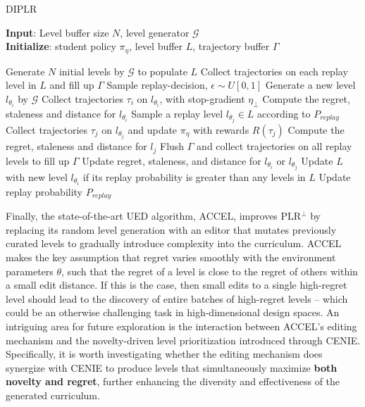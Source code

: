 \begin{algorithm}[H]
    \caption{DIPLR}
    \label{alg:diplr}
    \textbf{Input}: Level buffer size $N$, level generator $\mathcal{G}$ \\
    \textbf{Initialize}: student policy $\pi_\eta$, level buffer $L$, trajectory buffer $\Gamma$
    \begin{algorithmic}[1]
    \STATE Generate $N$ initial levels by $\mathcal{G}$ to populate $L$
    \STATE Collect trajectories on each replay level in $L$ and fill up $\Gamma$
        \STATE Sample replay-decision, $\epsilon \sim U[0,1]$
        \STATE Generate a new level $l_{\theta_i}$ by $\mathcal{G}$
        \STATE Collect trajectories $\tau_i$ on $l_{\theta_i}$, with stop-gradient $\eta_{\perp}$
        \STATE Compute the regret, staleness and distance for $l_{\theta_i}$
        \ELSE
        \STATE Sample a replay level $l_{\theta_j}\in L$ according to $P_{replay}$
        \STATE Collect trajectories $\tau_j$ on $l_{\theta_j}$ and update $\pi_\eta$ with rewards $R(\tau_j)$
        \STATE Compute the regret, staleness and distance for $l_j$
        \ENDIF
        \STATE Flush $\Gamma$ and collect trajectories on all replay levels to fill up $\Gamma$
        \STATE Update regret, staleness, and distance for $l_{\theta_i}$ or $l_{\theta_j}$
        \STATE Update $L$ with new level $l_{\theta_i}$ if its replay probability is greater than any levels in $L$
        \STATE Update replay probability $P_{replay}$ 
        \ENDWHILE
    \end{algorithmic}
\end{algorithm} 

Finally, the state-of-the-art UED algorithm, ACCEL, improves PLR$^\perp$ by replacing its random level generation with an editor that mutates previously curated levels to gradually introduce complexity into the curriculum. ACCEL makes the key assumption that regret varies smoothly with the environment parameters $\theta$, such that the regret of a level is close to the regret of others within a small edit distance. If this is the case, then small edits to a single high-regret level should lead to the discovery of entire batches of high-regret levels -- which could be an otherwise challenging task in high-dimensional design spaces. An intriguing area for future exploration is the interaction between ACCEL's editing mechanism and the novelty-driven level prioritization introduced through CENIE. Specifically, it is worth investigating whether the editing mechanism does synergize with CENIE to produce levels that simultaneously maximize \textbf{both novelty and regret}, further enhancing the diversity and effectiveness of the generated curriculum.

